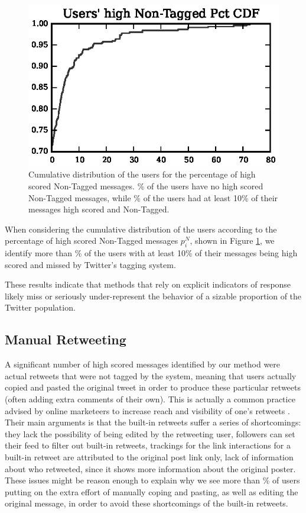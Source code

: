 \begin{figure}[!tb]
\centering
\includegraphics[scale=1]{./figures/users_high_nontagged_pct_cdf.eps}
\caption{Cumulative distribution of the users for the percentage of high scored Non-Tagged messages. \usersZeroHighScoredPct{}\% of the users have no high scored Non-Tagged messages, while \usersMoreThanTenPctPct{}\% of the users had at least 10\% of their messages high scored and Non-Tagged.}
\label{fig:cumulative_user}
\end{figure}


When considering the cumulative distribution of the users according to the percentage of high scored Non-Tagged messages $p_i^N$, shown in Figure \ref{fig:cumulative_user}, we identify more than \usersMoreThanTenPctPct{}\% of the users with at least 10\% of their messages being high scored and missed by Twitter's tagging system. 

These results indicate that methods that rely on explicit indicators of response likely miss or seriously under-represent the behavior of a sizable proportion of the Twitter population.


\subsection{Manual Retweeting}

A significant number of high scored messages identified by our method were actual retweets that were not tagged by the system, meaning that users actually copied and pasted the original tweet in order to produce these particular retweets (often adding extra comments of their own). This is actually a common practice advised by online marketeers to increase reach and visibility of one's retweets \cite{ManualRetweet1, ManualRetweet2, ManualRetweet3}. Their main arguments is that the built-in retweets suffer a series of shortcomings: they lack the possibility of being edited by the retweeting user, followers can set their feed to filter out built-in retweets, trackings for the link interactions for a built-in retweet are attributed to the original post link only, lack of information about who retweeted, since it shows more information about the original poster. These issues might be reason enough to explain why we see more than \usersMoreThanTenPctPct{}\% of users putting on the extra effort of manually coping and pasting, as well as editing the original message, in order to avoid these shortcomings of the built-in retweets.

